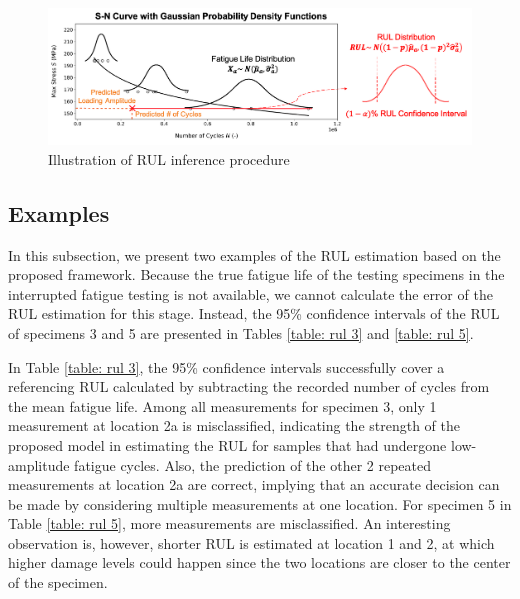 \begin{figure}[tb]
    \includegraphics[width=\linewidth]{fig/rul_inference_procedure.png}
    \caption{Illustration of RUL inference procedure}
    \label{fig: rul infer procedure}
\end{figure}

\subsection{Examples}

In this subsection, we present two examples of the RUL estimation based on the proposed framework. Because the true fatigue life of the testing specimens in the interrupted fatigue testing is not available, we cannot calculate the error of the RUL estimation for this stage. Instead, the 95\% confidence intervals of the RUL of specimens 3 and 5 are presented in Tables \ref{table: rul 3} and \ref{table: rul 5}. 

In Table \ref{table: rul 3}, the 95\% confidence intervals successfully cover a referencing RUL calculated by subtracting the recorded number of cycles from the mean fatigue life. Among all measurements for specimen 3, only 1 measurement at location 2a is misclassified, indicating the strength of the proposed model in estimating the RUL for samples that had undergone low-amplitude fatigue cycles. Also, the prediction of the other 2 repeated measurements at location 2a are correct, implying that an accurate decision can be made by considering multiple measurements at one location. For specimen 5 in Table \ref{table: rul 5}, more measurements are misclassified. An interesting observation is, however, shorter RUL is estimated at location 1 and 2, at which higher damage levels could happen since the two locations are closer to the center of the specimen. 

